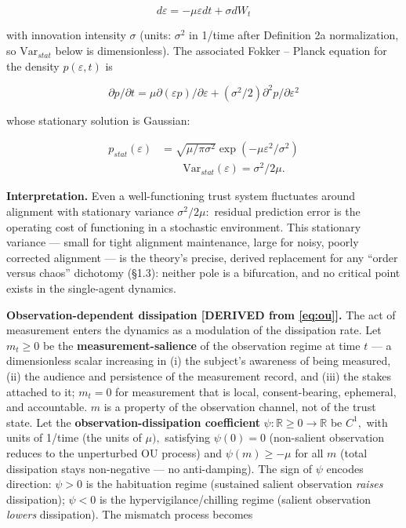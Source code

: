 \documentclass[11pt,twocolumn]{article}
\theoremstyle{gttdef}
\theoremstyle{gttplain}
\begin{document}
\begin{equation}
d\varepsilon = -\mu \varepsilon dt + \sigma dW_t
\label{eq:ou}
\end{equation}

with innovation intensity $\sigma$ (units: $\sigma^{2}$ in 1/time after Definition 2a normalization, so $\mathrm{Var}_{stat}$ below is dimensionless). The associated Fokker -- Planck equation for the density $p(\varepsilon, t)$ is

\begin{equation}
\partial p/\partial t = \mu \partial(\varepsilon p)/\partial \varepsilon + (\sigma^{2}/2) \partial^{2}p/\partial \varepsilon^{2}
\label{eq:fp}
\end{equation}

whose stationary solution is Gaussian:

\begin{equation}
\begin{split}
p_{stat}(\varepsilon) &= \sqrt{\mu/\pi \sigma^{2}} \exp(-\mu \varepsilon^{2}/\sigma^{2})\\
&\qquad \mathrm{Var}_{stat}(\varepsilon) = \sigma^{2}/2\mu.
\end{split}
\label{eq:stationary}
\end{equation}

\textbf{Interpretation.} Even a well-functioning trust system fluctuates around alignment with stationary variance $\sigma^{2}/2\mu:$ residual prediction error is the operating cost of functioning in a stochastic environment. This stationary variance --- small for tight alignment maintenance, large for noisy, poorly corrected alignment --- is the theory's precise, derived replacement for any ``order versus chaos'' dichotomy (\S{}1.3): neither pole is a bifurcation, and no critical point exists in the single-agent dynamics.

\textbf{Observation-dependent dissipation [DERIVED from \eqref{eq:ou}].} The act of measurement enters the dynamics as a modulation of the dissipation rate. Let $m_t \geq 0$ be the \textbf{measurement-salience} of the observation regime at time $t$ --- a dimensionless scalar increasing in (i) the subject's awareness of being measured, (ii) the audience and persistence of the measurement record, and (iii) the stakes attached to it; $m_t = 0$ for measurement that is local, consent-bearing, ephemeral, and accountable. $m$ is a property of the observation channel, not of the trust state. Let the \textbf{observation-dissipation coefficient} $\psi : \mathbb{R}\geq0 \to \mathbb{R}$ be $C^{1},$ with units of 1/time (the units of $\mu),$ satisfying $\psi(0) = 0$ (non-salient observation reduces to the unperturbed OU process) and $\psi(m) \geq -\mu$ for all $m$ (total dissipation stays non-negative --- no anti-damping). The sign of $\psi$ encodes direction: $\psi > 0$ is the habituation regime (sustained salient observation \emph{raises} dissipation); $\psi < 0$ is the hypervigilance/chilling regime (salient observation \emph{lowers} dissipation). The mismatch process becomes
\end{document}
